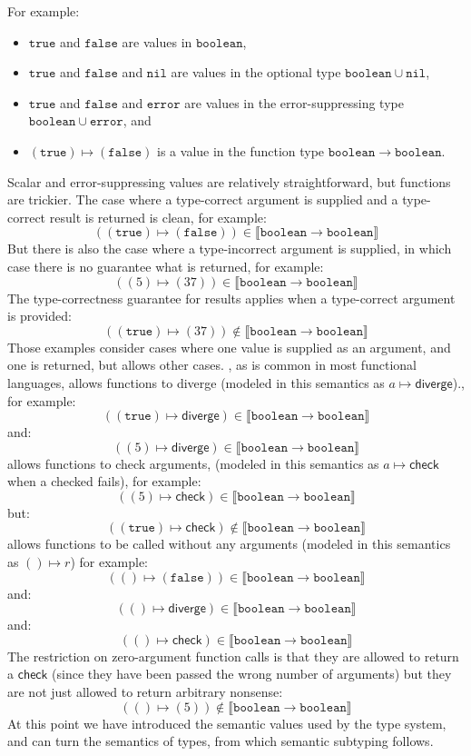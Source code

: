 \documentclass[acmsmall,review,screen]{acmart}
\newcommand{\ERROR}{\mathtt{error}}
\newcommand{\NIL}{\mathtt{nil}}
\newcommand{\TRUE}{\mathtt{true}}
\newcommand{\FALSE}{\mathtt{false}}
\newcommand{\BOOLEAN}{\mathtt{boolean}}
\newcommand{\DIVERGE}{\mathsf{diverge}}
\newcommand{\CHECK}{\mathsf{check}}
\newcommand{\fun}{\mathbin{\rightarrow}}
\newcommand{\sem}[1]{\llbracket{#1}\rrbracket}
\begin{document}
For example:
\begin{itemize}
  
\item $\TRUE$ and $\FALSE$ are values in $\BOOLEAN$,
\item $\TRUE$ and $\FALSE$ and $\NIL$ are values in the optional type $\BOOLEAN \cup \NIL$,
\item $\TRUE$ and $\FALSE$ and $\ERROR$ are values in the error-suppressing type $\BOOLEAN \cup \ERROR$,
  and 
\item $(\TRUE) \mapsto (\FALSE)$ is a value in the function type $\BOOLEAN \fun \BOOLEAN$.

\end{itemize}
Scalar and error-suppressing values are relatively straightforward, but
functions are trickier. The case where a type-correct argument is
supplied and a type-correct result is returned is clean, for example:
\[
  ((\TRUE) \mapsto (\FALSE)) \in \sem{\BOOLEAN \fun \BOOLEAN}
\]
But there is also the case where a type-incorrect argument is
supplied, in which case there is no guarantee what is returned, for example:
\[
  ((5) \mapsto (37)) \in \sem{\BOOLEAN \fun \BOOLEAN}
\]
The type-correctness guarantee for results applies when a type-correct argument is provided:
\[
  ((\TRUE) \mapsto (37)) \not\in \sem{\BOOLEAN \fun \BOOLEAN}
\]
Those examples consider cases where one value is supplied as an argument,
and one is returned, but  allows other cases.
, as is common in most functional languages, allows functions to diverge
(modeled in this semantics as $a \mapsto \DIVERGE$).,
for example:
\[
  ((\TRUE) \mapsto \DIVERGE) \in \sem{\BOOLEAN \fun \BOOLEAN}
\]
and:
\[
  ((5) \mapsto \DIVERGE) \in \sem{\BOOLEAN \fun \BOOLEAN}
\]
 allows functions to check arguments,
(modeled in this semantics as $a \mapsto \CHECK$ when a checked fails),
for example:
\[
  ((5) \mapsto \CHECK) \in \sem{\BOOLEAN \fun \BOOLEAN}
\]
but:
\[
  ((\TRUE) \mapsto \CHECK) \not\in \sem{\BOOLEAN \fun \BOOLEAN}
\]
 allows functions to be called without any arguments
(modeled in this semantics as $() \mapsto r$)
for example:
\[
  (() \mapsto (\FALSE)) \in \sem{\BOOLEAN \fun \BOOLEAN}
\]
and:
\[
  (() \mapsto \DIVERGE) \in \sem{\BOOLEAN \fun \BOOLEAN}
\]
and:
\[
  (() \mapsto \CHECK) \in \sem{\BOOLEAN \fun \BOOLEAN}
\]
The restriction on zero-argument function calls is that they are allowed to return
a $\CHECK$ (since they have been passed the wrong number of arguments)
but they are not just allowed to return arbitrary nonsense:
\[
  (() \mapsto (5)) \not\in \sem{\BOOLEAN \fun \BOOLEAN}
\]
At this point we have introduced the semantic values used by the  type
system, and can turn the semantics of types, from which semantic subtyping follows.
\end{document}
